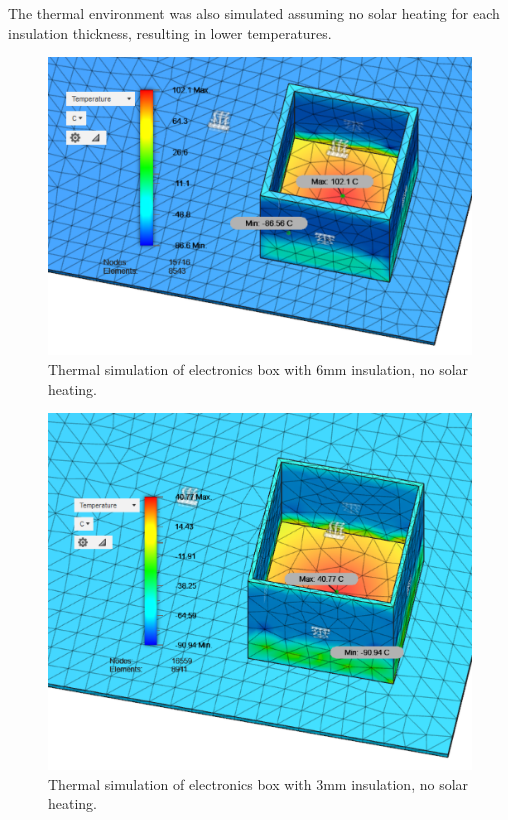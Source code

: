 The thermal environment was also simulated assuming no solar heating for each insulation thickness, resulting in lower temperatures. \\

	\begin{figure}[h!]
    \centering	
	\includegraphics[scale=0.58]{4-experiment-design/img/mechanical/6mmthicknoheat.PNG}
	\caption{Thermal simulation of electronics box with 6mm insulation, no solar heating.}
	\label{fig:6mmthicknoheat}
    	\end{figure}

	\begin{figure}[h!]
    \centering    	
    \includegraphics[scale=0.6]{4-experiment-design/img/mechanical/3mmthicknoheat.PNG}
	\caption{Thermal simulation of electronics box with 3mm insulation, no solar heating.}
	\label{fig:3mmthicknoheat}
	\end{figure}

